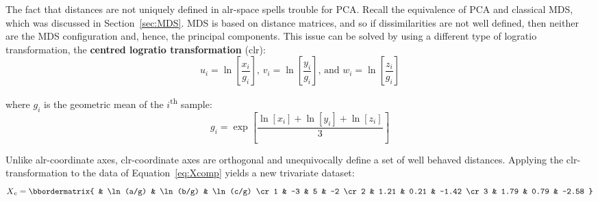The fact that distances are not uniquely defined in alr-space spells
trouble for PCA. Recall the equivalence of PCA and classical MDS,
which was discussed in Section~\ref{sec:MDS}. MDS is based on distance
matrices, and so if dissimilarities are not well defined, then neither
are the MDS configuration and, hence, the principal components. This
issue can be solved by using a different type of logratio
transformation, the \textbf{centred logratio transformation} (clr):
\begin{equation}
  u_i = \ln\!\left[\frac{x_i}{g_i}\right] \mbox{,~}
  v_i = \ln\!\left[\frac{y_i}{g_i}\right] \mbox{,~and~}
  w_i = \ln\!\left[\frac{z_i}{g_i}\right]
  \label{eq:clr}
\end{equation}

\noindent where $g_i$ is the geometric mean of the
$i$\textsuperscript{th} sample:
\[
g_i = \exp\!\left[\frac{\ln[x_i]+\ln[y_i]+\ln[z_i]}{3}\right]
\]

Unlike alr-coordinate axes, clr-coordinate axes are orthogonal and
unequivocally define a set of well behaved distances. Applying the
clr-transformation to the data of Equation~\ref{eq:Xcomp} yields a new
trivariate dataset:
\begin{equation}
  X\textsubscript{c} =
  \bbordermatrix{ & \ln(a/g) & \ln(b/g) & \ln(c/g) \cr
    1 & -3 & 5 & -2 \cr
    2 & 1.21  & 0.21 & -1.42 \cr
    3 & 1.79  & 0.79 & -2.58
  }
  \label{eq:Xc}
\end{equation}


